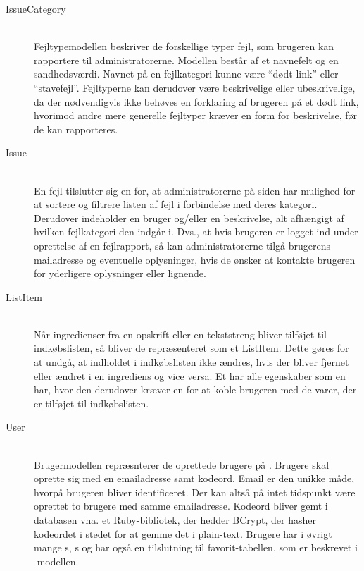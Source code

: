 \begin{description}
  \item[IssueCategory] \hfill \\
    Fejltypemodellen beskriver de forskellige typer fejl, som brugeren kan rapportere til administratorerne. Modellen består af et navnefelt og en sandhedsværdi. Navnet på en fejlkategori kunne \fx være ``dødt link'' eller ``stavefejl''. Fejltyperne kan derudover være beskrivelige eller ubeskrivelige, da der nødvendigvis ikke behøves en forklaring af brugeren på \fx et dødt link, hvorimod andre mere generelle fejltyper kræver en form for beskrivelse, før de kan rapporteres.

  \item[Issue] \hfill \\
    En fejl tilslutter sig en  for, at administratorerne på siden har mulighed for at sortere og filtrere listen af fejl i forbindelse med deres kategori. Derudover indeholder  en bruger og/eller en beskrivelse, alt afhængigt af hvilken fejlkategori den indgår i. Dvs., at hvis brugeren er logget ind under oprettelse af en fejlrapport, så kan administratorerne tilgå brugerens mailadresse og eventuelle oplysninger, hvis de ønsker at kontakte brugeren for yderligere oplysninger eller lignende.

  \item[ListItem] \hfill \\
    Når ingredienser fra en opskrift eller en tekststreng bliver tilføjet til indkøbslisten, så bliver de repræsenteret som et ListItem. Dette gøres for at undgå, at indholdet i indkøbslisten ikke ændres, hvis der bliver fjernet eller ændret i en ingrediens  og vice versa. Et  har alle egenskaber som en  har, hvor den derudover kræver en  for at koble brugeren med de varer, der er tilføjet til indkøbslisten.

  \item[User] \hfill \\
    Brugermodellen repræsnterer de oprettede brugere på \Foodl{}. Brugere skal oprette sig med en emailadresse samt kodeord. Email er den unikke måde, hvorpå brugeren bliver identificeret. Der kan altså på intet tidspunkt være oprettet to brugere med samme emailadresse. Kodeord bliver gemt i databasen vha. et Ruby-bibliotek, der hedder BCrypt, der hasher kodeordet i stedet for at gemme det i plain-text. Brugere har i øvrigt mange s, s og har også en tilslutning til favorit-tabellen, som er beskrevet i -modellen.

\end{description}

